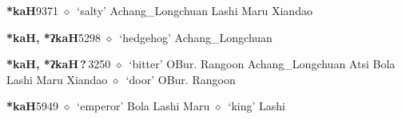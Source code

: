  \begin{list}{}{\leftmargin=1.5em \itemindent=-1.5em}
  \item {\footnotesize \textbf{*kaH}}{\tiny 9371}
         $\diamond$~`salty'
         Achang\_Longchuan 
\hspace{1ex}
         Lashi 
\hspace{1ex}
         Maru 
\hspace{1ex}
         Xiandao 
  \item {\footnotesize \textbf{*kaH, *ʔkaH}}{\tiny 5298}
\hspace{1ex}
         $\diamond$~`hedgehog'
         Achang\_Longchuan 
  \item {\footnotesize \textbf{*kaH, *ʔkaH\,?\,}}{\tiny 3250}
\hspace{1ex}
         $\diamond$~`bitter'
         OBur. 
\hspace{1ex}
         Rangoon 
\hspace{1ex}
         Achang\_Longchuan 
\hspace{1ex}
         Atsi 
\hspace{1ex}
         Bola 
\hspace{1ex}
         Lashi 
\hspace{1ex}
         Maru 
\hspace{1ex}
         Xiandao 
\hspace{1ex}
         $\diamond$~`door'
         OBur. 
\hspace{1ex}
         Rangoon 
  \item {\footnotesize \textbf{*kaH}}{\tiny 5949}
\hspace{1ex}
         $\diamond$~`emperor'
         Bola 
\hspace{1ex}
         Lashi 
\hspace{1ex}
         Maru 
\hspace{1ex}
         $\diamond$~`king'
         Lashi 

\end{list}
